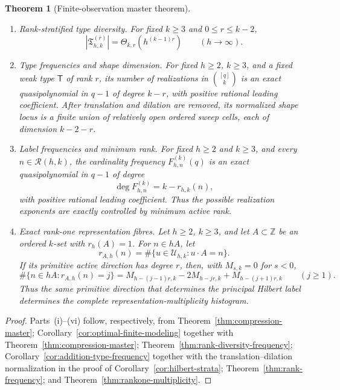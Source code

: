 \documentclass[11pt,reqno]{amsart}
\newtheorem{theorem}{Theorem}[section]
\theoremstyle{definition}
\theoremstyle{remark}
\newcommand{\Rcal}{\mathcal R}
\begin{document}
\begin{theorem}[Finite-observation master theorem]
\begin{enumerate}[label=\textup{(\roman*)}]
\item \emph{Rank-stratified type diversity.}
For fixed $k\geq3$ and $0\leq r\leq k-2$,
\begin{equation}\label{eq:rank-diversity-intro}
 |\mathfrak T_{h,k}^{(r)}|
 =\Theta_{k,r}\!\left(h^{(k-1)r}\right)
 \qquad(h\to\infty).
\end{equation}

\item \emph{Type frequencies and shape dimension.}
For fixed $h\geq2$, $k\geq3$, and a fixed weak type $\mathsf T$ of rank
$r$, its number of
realizations in $\binom{[q]}k$ is an exact quasipolynomial in $q-1$ of degree
$k-r$, with positive rational leading coefficient.  After translation and
dilation are removed, its normalized shape locus is a finite union of
relatively open ordered sweep cells, each of dimension $k-2-r$.

\item \emph{Label frequencies and minimum rank.}
For fixed $h\geq2$ and $k\geq3$, and every $n\in\Rcal(h,k)$, the
cardinality frequency $F^{(k)}_{h,n}(q)$ is an exact quasipolynomial in
$q-1$ of degree
\[
 \deg F^{(k)}_{h,n}=k-r_{h,k}(n),
\]
with positive rational leading coefficient.  Thus the possible realization
exponents are exactly controlled by minimum active rank.

\item \emph{Exact rank-one representation fibres.}
Let $h\geq2$, $k\geq3$, and let $A\subset\mathbb Z$ be an ordered
$k$-set with $r_h(A)=1$.  For $n\in hA$, let
\[
 r_{A,h}(n)=\#\{u\in\mathcal U_{h,k}:u\cdot A=n\}.
\]
If its primitive active direction has degree $r$, then,
with $M_{s,k}=0$ for $s<0$,
\begin{equation}\label{eq:rankone-multiplicity-intro}
 \#\{n\in hA:r_{A,h}(n)=j\}
 =M_{h-(j-1)r,k}-2M_{h-jr,k}+M_{h-(j+1)r,k}
 \qquad(j\geq1).
\end{equation}
Thus the same primitive direction that determines the principal Hilbert
label determines the complete representation-multiplicity histogram.
\end{enumerate}
\end{theorem}

\begin{proof}
Parts~\textup{(i)}--\textup{(vi)} follow, respectively, from
Theorem~\ref{thm:compression-master};
Corollary~\ref{cor:optimal-finite-modeling} together with
Theorem~\ref{thm:compression-master};
Theorem~\ref{thm:rank-diversity-frequency};
Corollary~\ref{cor:addition-type-frequency} together with the
translation--dilation normalization in the proof of
Corollary~\ref{cor:hilbert-strata};
Theorem~\ref{thm:rank-frequency}; and
Theorem~\ref{thm:rankone-multiplicity}.
\end{proof}
\end{document}
